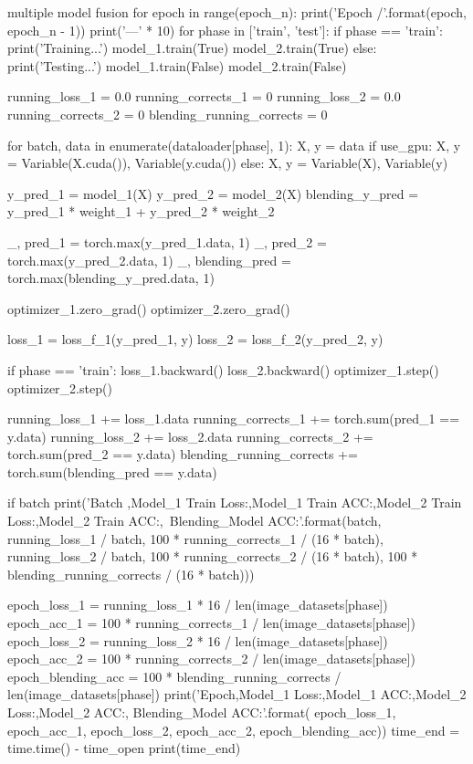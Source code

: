 \documentclass[openbib]{article}
\begin{document}
\begin{Python}{multiple model fusion}
for epoch in range(epoch_n):
	print('Epoch {}/{}'.format(epoch, epoch_n - 1))
	print('---' * 10)
	for phase in ['train', 'test']:
		if phase == 'train':
		print('Training...')
		model_1.train(True)
		model_2.train(True)
	else:
		print('Testing...')
		model_1.train(False)
		model_2.train(False)
	
	running_loss_1 = 0.0
	running_corrects_1 = 0
	running_loss_2 = 0.0
	running_corrects_2 = 0
	blending_running_corrects = 0
	
	for batch, data in enumerate(dataloader[phase], 1):
		X, y = data
	if use_gpu:
		X, y = Variable(X.cuda()), Variable(y.cuda())
	else:
		X, y = Variable(X), Variable(y)
	
	y_pred_1 = model_1(X)
	y_pred_2 = model_2(X)
	blending_y_pred = y_pred_1 * weight_1 + y_pred_2 * weight_2
	
	_, pred_1 = torch.max(y_pred_1.data, 1)
	_, pred_2 = torch.max(y_pred_2.data, 1)
	_, blending_pred = torch.max(blending_y_pred.data, 1)
	
	optimizer_1.zero_grad()
	optimizer_2.zero_grad()
	
	loss_1 = loss_f_1(y_pred_1, y)
	loss_2 = loss_f_2(y_pred_2, y)
	
	if phase == 'train':
		loss_1.backward()
		loss_2.backward()
		optimizer_1.step()
		optimizer_2.step()
	
	running_loss_1 += loss_1.data
	running_corrects_1 += torch.sum(pred_1 == y.data)
	running_loss_2 += loss_2.data
	running_corrects_2 += torch.sum(pred_2 == y.data)
	blending_running_corrects += torch.sum(blending_pred == y.data)
	
	if batch %
		print('Batch {},Model_1 Train Loss:{},Model_1 Train ACC:{},Model_2 Train Loss:{},Model_2 Train ACC:{},\
		Blending_Model ACC:{}'.format(batch, running_loss_1 / batch, 100 * running_corrects_1 / (16 * batch),
		running_loss_2 / batch, 100 * running_corrects_2 / (16 * batch),
		100 * blending_running_corrects / (16 * batch)))
	
	epoch_loss_1 = running_loss_1 * 16 / len(image_datasets[phase])
	epoch_acc_1 = 100 * running_corrects_1 / len(image_datasets[phase])
	epoch_loss_2 = running_loss_2 * 16 / len(image_datasets[phase])
	epoch_acc_2 = 100 * running_corrects_2 / len(image_datasets[phase])
	epoch_blending_acc = 100 * blending_running_corrects / len(image_datasets[phase])
	print('Epoch,Model_1 Loss:{},Model_1 ACC:{},Model_2  Loss:{},Model_2  ACC:{}, Blending_Model ACC:{}'.format(
	epoch_loss_1, epoch_acc_1, epoch_loss_2, epoch_acc_2, epoch_blending_acc))
time_end = time.time() - time_open
print(time_end)


\end{Python}
\end{document}

